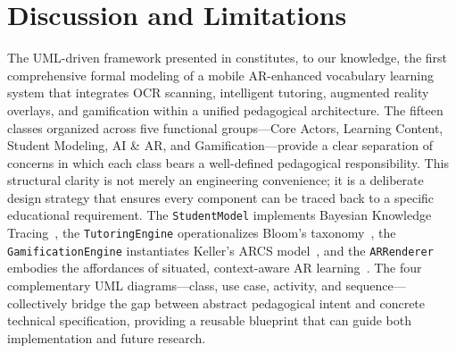 \section{Discussion and Limitations}
\label{sec:discussion}

The UML-driven framework presented in  constitutes, to our knowledge, the first comprehensive formal modeling of a mobile AR-enhanced vocabulary learning system that integrates OCR scanning, intelligent tutoring, augmented reality overlays, and gamification within a unified pedagogical architecture. The fifteen classes organized across five functional groups---Core Actors, Learning Content, Student Modeling, AI \& AR, and Gamification---provide a clear separation of concerns in which each class bears a well-defined pedagogical responsibility. This structural clarity is not merely an engineering convenience; it is a deliberate design strategy that ensures every component can be traced back to a specific educational requirement. The \texttt{StudentModel} implements Bayesian Knowledge Tracing~\cite{Corbett1994}, the \texttt{TutoringEngine} operationalizes Bloom's taxonomy~\cite{Bloom1956,Krathwohl2002}, the \texttt{GamificationEngine} instantiates Keller's ARCS model~\cite{Keller2010}, and the \texttt{ARRenderer} embodies the affordances of situated, context-aware AR learning~\cite{Azuma1997,Akcayir2017}. The four complementary UML diagrams---class, use case, activity, and sequence---collectively bridge the gap between abstract pedagogical intent and concrete technical specification, providing a reusable blueprint that can guide both implementation and future research.

